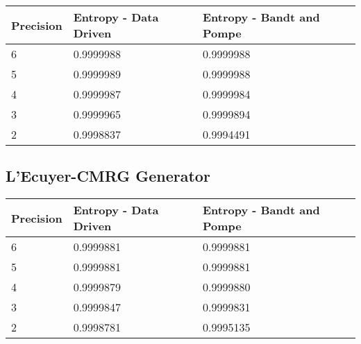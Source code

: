 \documentclass[12pt,letterpaper]{article}
\begin{document}
\begin{table}[H]
\begin{center}
\begin{tabularx}{\textwidth}{|p{2.3cm}|p{6.0cm}|p{6.0cm}|}
\hline                              
\textbf{Precision} & \textbf{Entropy - Data Driven} & \textbf{Entropy - Bandt and Pompe}\\
\hline
6 & 0.9999988 & 0.9999988\\
\hline
5 & 0.9999989 & 0.9999988\\
\hline     
4 & 0.9999987 & 0.9999984\\
\hline     
3 & 0.9999965 & 0.9999894\\
\hline     
2 & 0.9998837 & 0.9994491\\
\hline  
\end{tabularx}
\end{center}
\end{table}

\subsection{L'Ecuyer-CMRG Generator}

\begin{table}[H]
\begin{center}
\begin{tabularx}{\textwidth}{|p{2.3cm}|p{6.0cm}|p{6.0cm}|}
\hline                              
\textbf{Precision} & \textbf{Entropy - Data Driven} & \textbf{Entropy - Bandt and Pompe}\\
\hline
6 & 0.9999881 & 0.9999881\\
\hline
5 & 0.9999881 & 0.9999881\\
\hline     
4 & 0.9999879 & 0.9999880\\
\hline     
3 & 0.9999847 & 0.9999831\\
\hline     
2 & 0.9998781 & 0.9995135\\
\hline  
\end{tabularx}
\end{center}
\end{table}
\end{document}
